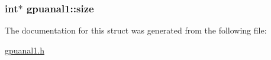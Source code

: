 \label{structgpuanal1_a91ed47f0624ec72ff8fba6f108377448}
\hypertarget{structgpuanal1_ad147c43387b95d5f71952a5e0fdb46ff}{
\subsubsection[{size}]{\setlength{\rightskip}{0pt plus 5cm}int$\ast$ {\bf gpuanal1::size}}}
\label{structgpuanal1_ad147c43387b95d5f71952a5e0fdb46ff}


The documentation for this struct was generated from the following file:\begin{DoxyCompactItemize}
\item 
\hyperlink{gpuanal1_8h}{gpuanal1.h}\end{DoxyCompactItemize}
